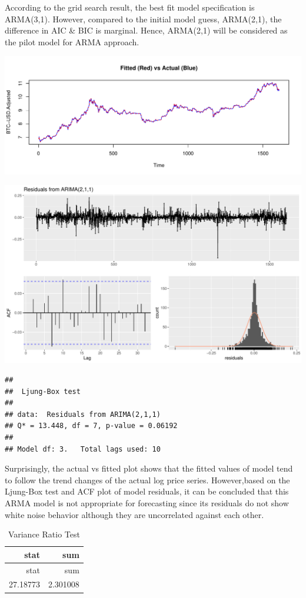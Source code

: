 \documentclass[
  11pt,
]{article}
\begin{document}
According to the grid search result, the best fit model specification is
ARMA(3,1). However, compared to the initial model guess, ARMA(2,1), the
difference in AIC \& BIC is marginal. Hence, ARMA(2,1) will be
considered as the pilot model for ARMA approach.

\includegraphics{ST436_Project_files/figure-latex/unnamed-chunk-17-1.pdf}

\includegraphics{ST436_Project_files/figure-latex/unnamed-chunk-18-1.pdf}

\begin{verbatim}
## 
##  Ljung-Box test
## 
## data:  Residuals from ARIMA(2,1,1)
## Q* = 13.448, df = 7, p-value = 0.06192
## 
## Model df: 3.   Total lags used: 10
\end{verbatim}

Surprisingly, the actual vs fitted plot shows that the fitted values of
model tend to follow the trend changes of the actual log price series.
However,based on the Ljung-Box test and ACF plot of model residuals, it
can be concluded that this ARMA model is not appropriate for forecasting
since its residuals do not show white noise behavior although they are
uncorrelated against each other.

\begin{longtable}[]{@{}rr@{}}
\caption{Variance Ratio Test}\tabularnewline
\toprule
stat & sum \\
\midrule
\endfirsthead
\toprule
stat & sum \\
\midrule
\endhead
27.18773 & 2.301008 \\
\bottomrule
\end{longtable}
\end{document}
